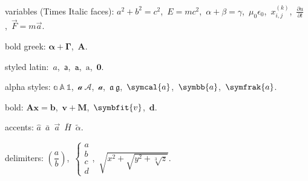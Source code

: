 \documentclass{article}
\begin{document}
variables (Times Italic faces):
$a^2+b^2=c^2$,\ $E=mc^2$,\ $\alpha+\beta=\gamma$,\ $\mu_0\epsilon_0$,\
$x_{i,j}^{(k)}$,\ $\frac{\partial u}{\partial t}$,\ $\vec{F}=m\vec{a}$.

bold greek: $\symbf{\alpha}+\symbf{\Gamma}$,\ $\mathbf{A}$.

styled latin:\
$\mathit{a}$,\ $\mathsf{a}$,\ $\mathtt{a}$,\ $\mathrm{a}$,\ $\mathbf{0}$.

alpha styles: $\mathbb{a}\ \mathbb{A}\ \mathbb{1}$,\
$\mathcal{a}\ \mathcal{A}$,\ $\mathscr{a}$,\ $\mathfrak{a}\ \mathfrak{g}$,\
$\symcal{a}$,\ $\symbb{a}$,\ $\symfrak{a}$.

bold: $\mathbf{Ax}=\mathbf{b}$,\ $\symbf{v}+\symbf{M}$,\ $\symbfit{v}$,\ $\symbf{d}$.

accents: $\hat{a}$\ $\bar{a}$\ $\vec{a}$\ $\bar{H}$\ $\tilde{\alpha}$.

delimiters: $\left( \dfrac{a}{b} \right)$,\
$\left\{ \begin{array}{c} a \\ b \\ c \\ d \end{array} \right.$,\
$\sqrt{x^{2}+\sqrt{y^{2}+\sqrt[3]{z}}}$.
\end{document}
